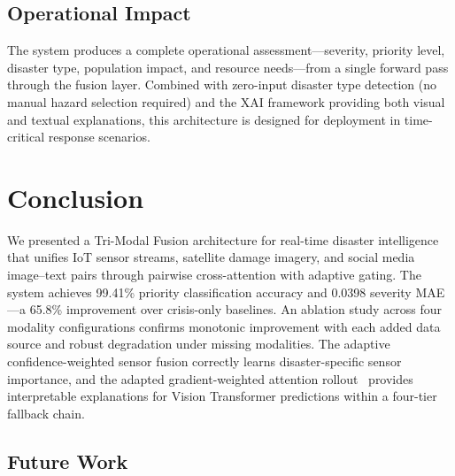\documentclass[journal]{IEEEtran}
\begin{document}
\subsection{Operational Impact}

The system produces a complete operational assessment---severity, priority level, disaster type, population impact, and resource needs---from a single forward pass through the fusion layer. Combined with zero-input disaster type detection (no manual hazard selection required) and the XAI framework providing both visual and textual explanations, this architecture is designed for deployment in time-critical response scenarios.

\section{Conclusion}

We presented a Tri-Modal Fusion architecture for real-time disaster intelligence that unifies IoT sensor streams, satellite damage imagery, and social media image--text pairs through pairwise cross-attention with adaptive gating. The system achieves 99.41\% priority classification accuracy and 0.0398 severity MAE---a 65.8\% improvement over crisis-only baselines. An ablation study across four modality configurations confirms monotonic improvement with each added data source and robust degradation under missing modalities. The adaptive confidence-weighted sensor fusion correctly learns disaster-specific sensor importance, and the adapted gradient-weighted attention rollout~\cite{chefer2021transformer} provides interpretable explanations for Vision Transformer predictions within a four-tier fallback chain.

\subsection{Future Work}
\label{sec:future}
\end{document}
